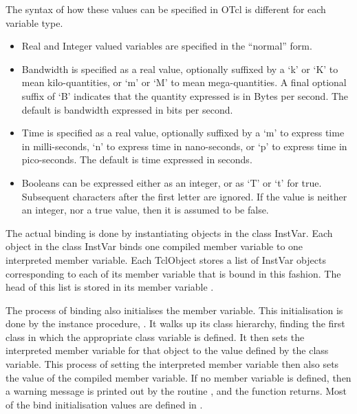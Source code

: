\documentclass{article}
\begin{document}
The syntax of how these values can be specified in OTcl is different
for each variable type.
\begin{itemize}
\item Real and Integer valued variables are specified in the ``normal'' form.
\item Bandwidth is specified as a real value, optionally
  suffixed by a `k' or `K' to mean kilo-quantities, or `m' or `M' to
  mean mega-quantities.
  A final optional suffix of `B' indicates that the quantity expressed
  is in Bytes per second.
  The default is bandwidth expressed in bits per second.
\item Time is specified as a real value, optionally suffixed by a
  `m' to express time in milli-seconds, `n' to express time in
  nano-seconds, or `p' to express time in pico-seconds.
  The default is time expressed in seconds.
\item Booleans can be expressed either as an integer, or as `T' or `t'
  for true.  Subsequent characters after the first letter are ignored.
  If the value is neither an integer, nor a true value,
  then it is assumed to be false.
\end{itemize}

\danger
The actual binding is done by instantiating objects in the
class InstVar.  Each object in the class InstVar binds 
one compiled member variable to one interpreted member variable.
Each TclObject stores a list of InstVar objects corresponding
to each of its member variable that is bound in this fashion.
The head of this list is stored in its member variable
.
\closedanger

The process of binding also initialises the member variable.
This initialisation is done by the instance procedure,
.
It walks up its class hierarchy, finding the first class
in which the appropriate class variable is defined.
It then sets the interpreted member variable for that object
to the value defined by the class variable.
This process of setting the interpreted member variable then
also sets the value of the compiled member variable.
If no member variable is defined, then a warning message is printed
out by the routine
,
and the function returns.
Most of the bind initialisation values are defined in
.
\end{document}
